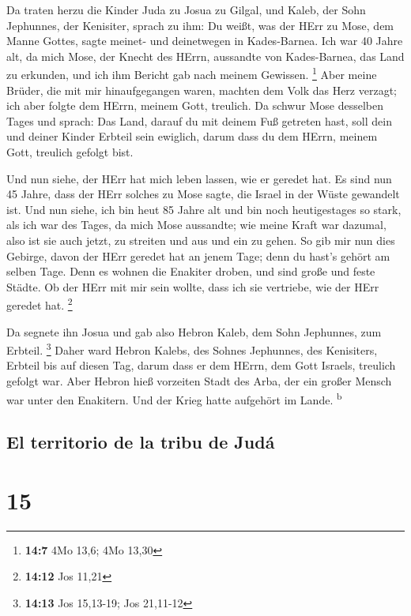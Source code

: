  Da traten herzu die Kinder Juda zu Josua zu Gilgal, und
Kaleb, der Sohn Jephunnes, der Kenisiter, sprach zu ihm: Du weißt, was
der HErr zu Mose, dem Manne Gottes, sagte meinet- und deinetwegen in
Kades-Barnea.  Ich war 40 Jahre alt, da mich Mose, der
Knecht des HErrn, aussandte von Kades-Barnea, das Land zu erkunden, und
ich ihm Bericht gab nach meinem Gewissen. \footnote{\textbf{14:7} 4Mo
  13,6; 4Mo 13,30}  Aber meine Brüder, die mit mir
hinaufgegangen waren, machten dem Volk das Herz verzagt; ich aber folgte
dem HErrn, meinem Gott, treulich.  Da schwur Mose
desselben Tages und sprach: Das Land, darauf du mit deinem Fuß getreten
hast, soll dein und deiner Kinder Erbteil sein ewiglich, darum dass du
dem HErrn, meinem Gott, treulich gefolgt bist.

 Und nun siehe, der HErr hat mich leben lassen, wie er
geredet hat. Es sind nun 45 Jahre, dass der HErr solches zu Mose sagte,
die Israel in der Wüste gewandelt ist. Und nun siehe, ich bin heut 85
Jahre alt  und bin noch heutigestages so stark, als ich
war des Tages, da mich Mose aussandte; wie meine Kraft war dazumal, also
ist sie auch jetzt, zu streiten und aus und ein zu gehen.
 So gib mir nun dies Gebirge, davon der HErr geredet hat
an jenem Tage; denn du hast's gehört am selben Tage. Denn es wohnen die
Enakiter droben, und sind große und feste Städte. Ob der HErr mit mir
sein wollte, dass ich sie vertriebe, wie der HErr geredet hat.
\footnote{\textbf{14:12} Jos 11,21}

 Da segnete ihn Josua und gab also Hebron Kaleb, dem Sohn
Jephunnes, zum Erbteil. \footnote{\textbf{14:13} Jos 15,13-19; Jos
  21,11-12}  Daher ward Hebron Kalebs, des Sohnes
Jephunnes, des Kenisiters, Erbteil bis auf diesen Tag, darum dass er dem
HErrn, dem Gott Israels, treulich gefolgt war.  Aber
Hebron hieß vorzeiten Stadt des Arba, der ein großer Mensch war unter
den Enakitern. Und der Krieg hatte aufgehört im Lande.
\textsuperscript{b}

\hypertarget{el-territorio-de-la-tribu-de-juduxe1}{%
\subsection{El territorio de la tribu de
Judá}\label{el-territorio-de-la-tribu-de-juduxe1}}

\hypertarget{section-14}{%
\section{15}\label{section-14}}

